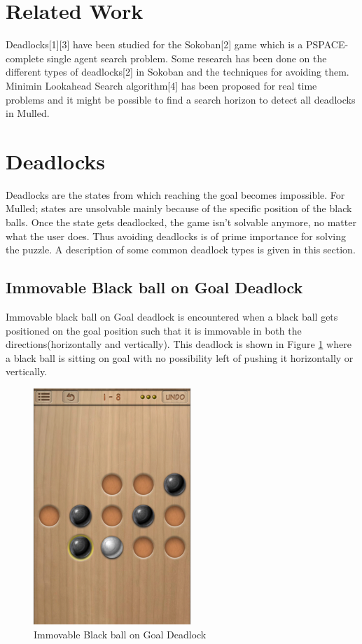 \documentclass[letterpaper]{article}
\begin{document}
\section{Related Work}
Deadlocks[1][3] have been studied for the Sokoban[2] game which is a PSPACE-complete single agent search problem. Some research has been done on the different types of deadlocks[2] in Sokoban and the techniques for avoiding them. Minimin Lookahead Search algorithm[4] has been proposed for real time problems and it might be possible to find a search horizon to detect all deadlocks in Mulled.



\section{Deadlocks}
Deadlocks are the states from which reaching the goal becomes impossible. For Mulled; states are unsolvable mainly because of the specific position of the black balls.  Once the state gets deadlocked, the game isn't solvable anymore, no matter what the user does. Thus avoiding deadlocks is of prime importance for solving the puzzle. A description of some common deadlock types is given in this section.

\subsection{Immovable Black ball on Goal Deadlock}
Immovable black ball on Goal deadlock is encountered when a black ball gets positioned on the goal position such that it is immovable in both the directions(horizontally and vertically). This deadlock is shown in Figure \ref{fig:Deadlock1} where a black ball is sitting on goal with no possibility left of pushing it horizontally or vertically.

\begin{figure}
\centering
\includegraphics[scale=.5]{Deadlock-1.png} \caption{Immovable Black ball on Goal Deadlock}
\label{fig:Deadlock1}
\end{figure}
\end{document}
